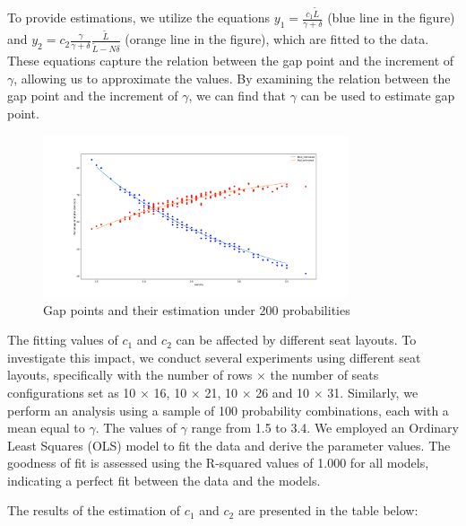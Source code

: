 To provide estimations, we utilize the equations $y_1 = \frac{c_1 \tilde{L}}{\gamma + \delta}$ (blue line in the figure) and $y_2 = c_2 \frac{\gamma}{\gamma + \delta} \frac{\tilde{L}}{\tilde{L}-N \delta}$ (orange line in the figure), which are fitted to the data. These equations capture the relation between the gap point and the increment of $\gamma$, allowing us to approximate the values. By examining the relation between the gap point and the increment of $\gamma$, we can find that $\gamma$ can be used to estimate gap point.

\begin{figure}[ht]
  \centering
    \includegraphics[width=0.8\textwidth]{./Figures/re2.pdf}
  \caption{Gap points and their estimation under 200 probabilities}
\end{figure}

The fitting values of $c_1$ and $c_2$ can be affected by different seat layouts. To investigate this impact, we conduct several experiments using different seat layouts, specifically with the number of rows $\times$ the number of seats configurations set as 10 $\times$ 16, 10 $\times$ 21, 10 $\times$ 26 and 10 $\times$ 31. Similarly, we perform an analysis using a sample of 100 probability combinations, each with a mean equal to $\gamma$. The values of $\gamma$ range from 1.5 to 3.4. We employed an Ordinary Least Squares (OLS) model to fit the data and derive the parameter values. The goodness of fit is assessed using the R-squared values of 1.000 for all models, indicating a perfect fit between the data and the models.

The results of the estimation of $c_1$ and $c_2$ are presented in the table below:

